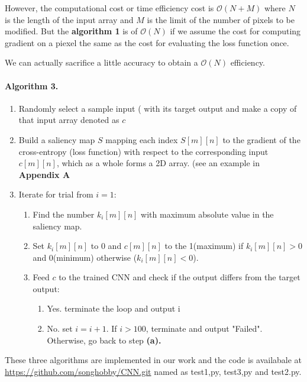 \documentclass{article}
\begin{document}
However, the computational cost or time efficiency cost is $\mathcal{O}(N+M)$ where $N$ is the length of the input array and $M$ is the limit of the number of pixels to be modified. 
But the \textbf{algorithm 1} is of $\mathcal{O}(N)$ if we assume the cost for computing gradient on a piexel the same as the cost for evaluating the loss function once.

We can actually sacrifice a little accuracy to obtain a $\mathcal{O}(N)$ efficiency.

\paragraph{Algorithm 3.}
\begin{enumerate}
\item Randomly select a sample input ( with its target output and make a copy of that input array denoted as $c$

\item Build a saliency map $S$ mapping each index $S[m][n]$ to the gradient of the cross-entropy (loss function) with respect to the corresponding input$c[m][n]$, which as a whole forms a 2D array. (see an example in \textbf{Appendix A}

\item Iterate for trial from $i=1$:

\begin{enumerate}
	\item Find the number $k_i[m][n]$ with maximum absolute value in the saliency map.

	\item Set $k_i[m][n]$ to 0 and $c[m][n]$ to the 1(maximum) if $k_i[m][n] > 0$ and 0(minimum) otherwise ($k_i[m][n] < 0$).

	\item Feed $c$ to the trained CNN and check if the output differs from the target output:
		\begin{enumerate}
			\item Yes. terminate the loop and output i
			\item No. set $i=i+1$. If $i > 100$, terminate and output "Failed". Otherwise, go back to step \textbf{(a).}
		\end{enumerate}
\end{enumerate}
\end{enumerate}

These three algorithms are implemented in our work and the code is availabale at \url{https://github.com/songhobby/CNN.git} named as test1,py, test3,py and test2.py.
\end{document}
